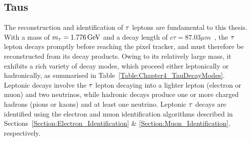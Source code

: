 \subsection{Taus}
\label{Section:Chapter4_Taus}

The reconstruction and identification of $\tau$ leptons are fundamental to this thesis. With a mass of $m_\tau = 1.776\,\text{Ge\hspace{-.08em}V}$ and a decay length of $c\tau = 87.03\unit{\mu m}$~\cite{ParticleMasses}, the $\tau$ lepton decays promptly before reaching the pixel tracker, and must therefore be reconstructed from its decay products. Owing to its relatively large mass, it exhibits a rich variety of decay modes, which proceed either leptonically or hadronically, as summarised in Table~\ref{Table:Chapter4_TauDecayModes}. Leptonic decays involve the $\tau$ lepton decaying into a lighter lepton (electron or muon) and two neutrinos, while hadronic decays produce one or more charged hadrons (pions or kaons) and at least one neutrino. Leptonic $\tau$ decays are identified using the electron and muon identification algorithms described in Sections~\ref{Section:Electron_Identification} \& \ref{Section:Muon_Identification}, respectively.

